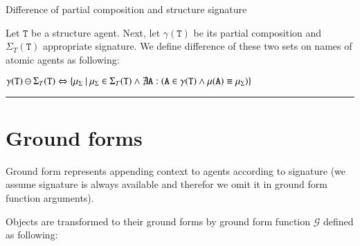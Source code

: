 \documentclass{elsarticle}
\begin{document}
\begin{definition}{Difference of partial composition and structure signature}

Let $\mathtt{T}$ be a structure agent. Next, let $\gamma(\mathtt{T})$ be its partial composition and $\Sigma_T(\mathtt{T})$ appropriate signature. We define difference of these two sets on names of atomic agents as following:

\begin{center}
$\gamma(\mathtt{T}) \ominus \Sigma_T(\mathtt{T}) \Leftrightarrow \{ \mu_\Sigma ~|~ \mu_\Sigma \in \Sigma_T(\mathtt{T}) \wedge \not\exists \mathtt{A}: (\mathtt{A} \in \gamma(\mathtt{T}) \wedge \mu(\mathtt{A}) \equiv \mu_\Sigma)\}$
\end{center}
\end{definition}

\noindent\rule{\textwidth}{2pt}

\section{Ground forms}

Ground form represents appending context to agents according to signature (we assume signature is always available and therefor we omit it in ground form function arguments).

Objects are transformed to their ground forms by ground form function $\mathcal{G}$ defined as following:
\end{document}
